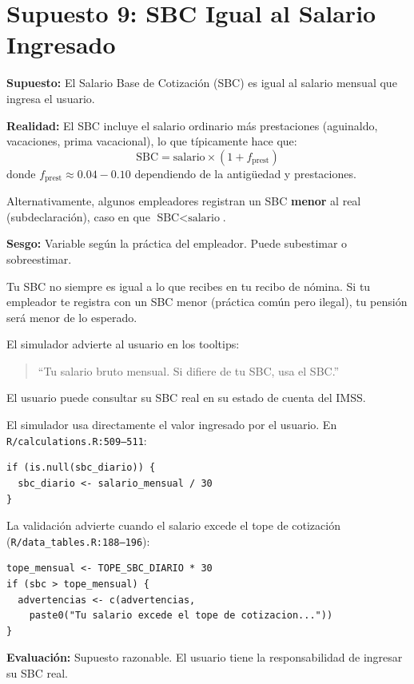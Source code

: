 \documentclass[11pt,a4paper]{report}
\begin{document}
\section{Supuesto 9: SBC Igual al Salario Ingresado}

\begin{tcolorbox}[colback=blue!5!white, colframe=blue!75!black, title=\textbf{Definici\'on Formal}]
\textbf{Supuesto:} El Salario Base de Cotizaci\'on (SBC) es igual al salario mensual que ingresa el usuario.

\textbf{Realidad:} El SBC incluye el salario ordinario m\'as prestaciones (aguinaldo, vacaciones, prima vacacional), lo que t\'ipicamente hace que:
\[
  \text{SBC} = \text{salario} \times (1 + f_{\text{prest}})
\]
donde $f_{\text{prest}} \approx 0.04 - 0.10$ dependiendo de la antig\"uedad y prestaciones.

Alternativamente, algunos empleadores registran un SBC \textbf{menor} al real (subdeclaraci\'on), caso en que $\text{SBC} < \text{salario}$.

\textbf{Sesgo:} Variable seg\'un la pr\'actica del empleador. Puede subestimar o sobreestimar.
\end{tcolorbox}

\begin{tcolorbox}[colback=green!5!white, colframe=green!50!black, title=\textbf{Intuici\'on}]
Tu SBC no siempre es igual a lo que recibes en tu recibo de n\'omina. Si tu empleador te registra con un SBC menor (pr\'actica com\'un pero ilegal), tu pensi\'on ser\'a menor de lo esperado.

El simulador advierte al usuario en los tooltips:
\begin{quote}
``Tu salario bruto mensual. Si difiere de tu SBC, usa el SBC.''
\end{quote}

El usuario puede consultar su SBC real en su estado de cuenta del IMSS.
\end{tcolorbox}

\begin{tcolorbox}[colback=orange!5!white, colframe=orange!75!black, title=\textbf{Aplicaci\'on en C\'odigo}]
El simulador usa directamente el valor ingresado por el usuario. En \texttt{R/calculations.R:509--511}:
\begin{lstlisting}
if (is.null(sbc_diario)) {
  sbc_diario <- salario_mensual / 30
}
\end{lstlisting}

La validaci\'on advierte cuando el salario excede el tope de cotizaci\'on (\texttt{R/data\_tables.R:188--196}):
\begin{lstlisting}
tope_mensual <- TOPE_SBC_DIARIO * 30
if (sbc > tope_mensual) {
  advertencias <- c(advertencias,
    paste0("Tu salario excede el tope de cotizacion..."))
}
\end{lstlisting}

\textbf{Evaluaci\'on:} Supuesto razonable. El usuario tiene la responsabilidad de ingresar su SBC real.
\end{tcolorbox}
\end{document}
